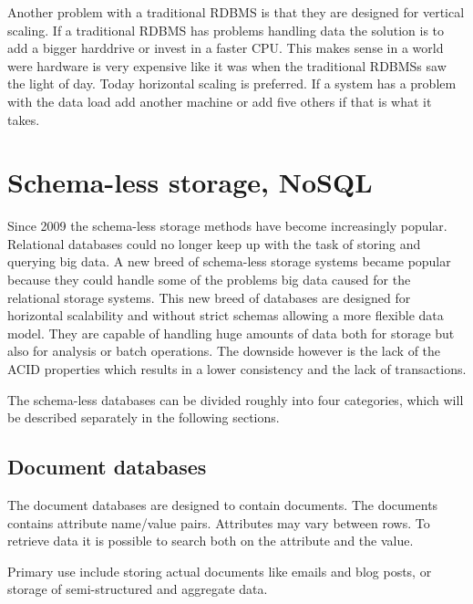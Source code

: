 Another problem with a traditional RDBMS is that they are designed for vertical scaling\cite{Atzeni:TheRelationalModelIsDead}. If a traditional RDBMS has problems handling data the solution is to add a bigger harddrive or invest in a faster CPU. This makes sense in a world were hardware is very expensive like it was when the traditional RDBMSs saw the light of day\cite{Stonebraker:TheEndOfAnArchitecturalEra}. Today horizontal scaling is preferred. If a system has a problem with the data load add another machine or add five others if that is what it takes.

\section{Schema-less storage, NoSQL}
\label{sec:nosql}
Since 2009 the schema-less storage methods have become increasingly popular.
Relational databases could no longer keep up with the task of storing and querying big data.
A new breed of schema-less storage systems became popular because they could handle some of the problems big data caused for the relational storage systems.
This new breed of databases are designed for horizontal scalability and without strict schemas allowing a more flexible data model. 
They are capable of handling huge amounts of data both for storage but also for analysis or batch operations.
The downside however is the lack of the ACID properties which results in a lower consistency and the lack of transactions. %

The schema-less databases can be divided roughly into four categories\cite{Fowler:IntroNoSQL, Moniruzzaman:NoSQLDatabaseNewEraOfDatabasesForBigDataAnalysis}, which will be described separately in the following sections.

\subsection{Document databases}
The document databases are designed to contain documents.
The documents contains attribute name/value pairs.
Attributes may vary between rows.
To retrieve data it is possible to search both on the attribute and the value.

Primary use include storing actual documents like emails and blog posts, or storage of semi-structured and aggregate data.

